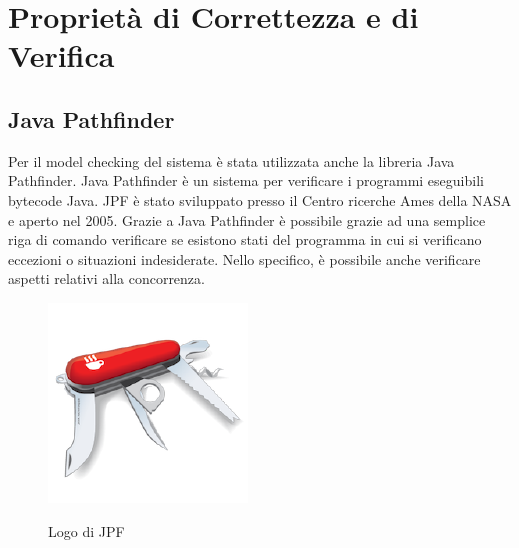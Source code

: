 \chapter{Proprietà di Correttezza e di Verifica}

\section{Java Pathfinder}
Per il model checking del sistema è stata utilizzata anche la libreria Java Pathfinder.\newline
Java Pathfinder è un sistema per verificare i programmi eseguibili bytecode Java. JPF è stato sviluppato presso il Centro ricerche Ames della NASA e aperto nel 2005.\newline
Grazie a Java Pathfinder è possibile grazie ad una semplice riga di comando verificare se esistono stati del programma in cui si verificano eccezioni o situazioni indesiderate.\newline
Nello specifico, è possibile anche verificare aspetti relativi alla concorrenza.\newline
\begin{figure}[H]
	\begin{center}
		\includegraphics[width=0.25\linewidth]{img/JavaPathFinder.png}
		\label{fig:jpflogo}
		\caption{Logo di JPF}
	\end{center}
\end{figure}

